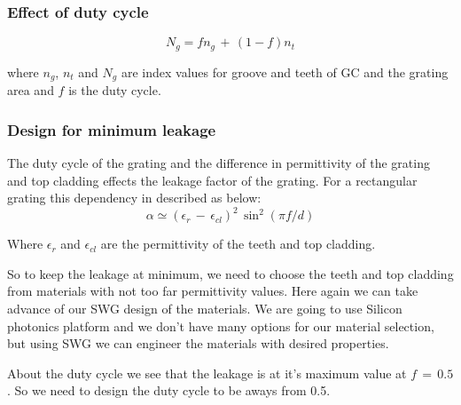 \documentclass{article}
\begin{document}
\subsubsection{Effect of duty cycle}
\label{effectdutycycle}
\begin{equation}
N_{g} = f n_g \, + \, (1-f)n_t
\end{equation}

where $n_g$, $n_t$ and $N_{g}$ are index values for groove and teeth of GC and the grating area and $f$ is the duty cycle.


\subsubsection{Design for minimum leakage}
\label{minleakage}

The duty cycle of the grating and the difference in permittivity of the grating and top cladding effects the leakage factor of the grating. For a rectangular grating this dependency in described as below:
\begin{equation}
\alpha \simeq (\epsilon_r \,- \, \epsilon_{cl})^2 \, \sin^2(\pi f /d)
\end{equation}

Where $\epsilon_r$ and $\epsilon_{cl}$ are the permittivity of the teeth and top cladding.

So to keep the leakage at minimum, we need to choose the teeth and top cladding from materials with not too far permittivity values. Here again we can take advance of our SWG design of the materials. We are going to use Silicon photonics platform and we don't have many options for our material selection, but using SWG we can engineer the materials with desired properties.

About the duty cycle we see that the leakage is at it's maximum value at $f \, = \,0.5$. So we need to design the duty cycle to be aways from 0.5. 
\end{document}
